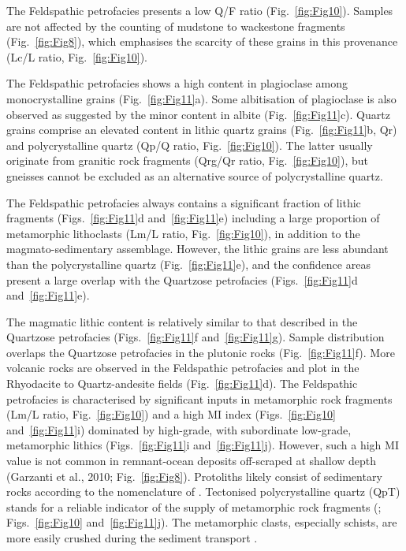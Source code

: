 \documentclass[twoside]{article}
\begin{document}
The Feldspathic petrofacies presents a low Q/F ratio (Fig.~\ref{fig:Fig10}). Samples are not affected by the counting of mudstone to wackestone fragments (Fig.~\ref{fig:Fig8}), which emphasises the scarcity of these grains in this provenance (Lc/L ratio, Fig.~\ref{fig:Fig10}).\par
\medskip
The Feldspathic petrofacies shows a high content in plagioclase among monocrystalline grains (Fig.~\ref{fig:Fig11}a). Some albitisation of plagioclase \citep{Morad2000} is also observed as suggested by the minor content in albite (Fig.~\ref{fig:Fig11}c). Quartz grains comprise an elevated content in lithic quartz grains (Fig.~\ref{fig:Fig11}b, Qr) and polycrystalline quartz (Qp/Q ratio, Fig.~\ref{fig:Fig10}). The latter usually originate from granitic rock fragments (Qrg/Qr ratio, Fig.~\ref{fig:Fig10}), but gneisses cannot be excluded as an alternative source of polycrystalline quartz.\par
\medskip
The Feldspathic petrofacies always contains a significant fraction of lithic fragments (Figs.~\ref{fig:Fig11}d and~\ref{fig:Fig11}e) including a large proportion of metamorphic lithoclasts (Lm/L ratio, Fig.~\ref{fig:Fig10}), in addition to the magmato-sedimentary assemblage. However, the lithic grains are less abundant than the polycrystalline quartz (Fig.~\ref{fig:Fig11}e), and the confidence areas present a large overlap with the Quartzose petrofacies (Figs.~\ref{fig:Fig11}d and~\ref{fig:Fig11}e).\par
\medskip
The magmatic lithic content is relatively similar to that described in the Quartzose petrofacies (Figs.~\ref{fig:Fig11}f and~\ref{fig:Fig11}g). Sample distribution overlaps the Quartzose petrofacies in the plutonic rocks (Fig.~\ref{fig:Fig11}f). More volcanic rocks are observed in the Feldspathic petrofacies and plot in the Rhyodacite to Quartz-andesite fields (Fig.~\ref{fig:Fig11}d). The Feldspathic petrofacies is characterised by significant inputs in metamorphic rock fragments (Lm/L ratio, Fig.~\ref{fig:Fig10}) and a high MI index (Figs.~\ref{fig:Fig10} and~\ref{fig:Fig11}i) dominated by high-grade, with subordinate low-grade, metamorphic lithics (Figs.~\ref{fig:Fig11}i and~\ref{fig:Fig11}j). However, such a high MI value is not common in remnant-ocean deposits off-scraped at shallow depth (Garzanti et al., 2010; Fig.~\ref{fig:Fig8}). Protoliths likely consist of sedimentary rocks according to the nomenclature of \citep{Garzanti2003}. Tectonised polycrystalline quartz (QpT) stands for a reliable indicator of the supply of metamorphic rock fragments (\citealp{Young1976}; Figs.~\ref{fig:Fig10} and~\ref{fig:Fig11}j). The metamorphic clasts, especially schists, are more easily crushed during the sediment transport \cite{Picard2007}.
\end{document}
